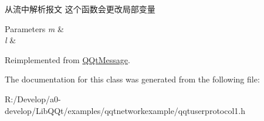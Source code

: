 从流中解析报文 这个函数会更改局部变量 


\begin{DoxyParams}{Parameters}
{\em m} & \\
\hline
{\em l} & \\
\hline
\end{DoxyParams}


Reimplemented from \mbox{\hyperlink{class_q_qt_message_a0bc25669bdd61490b1d8df6d77565f31}{Q\+Qt\+Message}}.



The documentation for this class was generated from the following file\+:\begin{DoxyCompactItemize}
\item 
R\+:/\+Develop/a0-\/develop/\+Lib\+Q\+Qt/examples/qqtnetworkexample/qqtuserprotocol1.\+h\end{DoxyCompactItemize}
